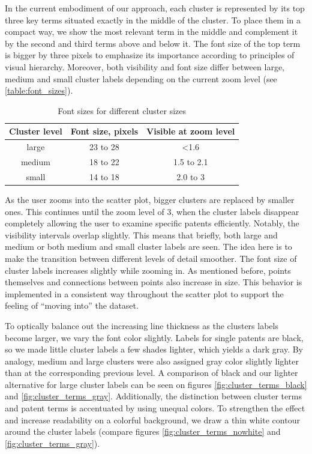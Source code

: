 In the current embodiment of our approach, each cluster is represented by its top three key terms situated exactly in the middle of the cluster.
To place them in a compact way, we show the most relevant term in the middle and complement it by the second and third terms above and below it.
The font size of the top term is bigger by three pixels to emphasize its importance according to principles of visual hierarchy.
Moreover, both visibility and font size differ between large, medium and small cluster labels depending on the current zoom level (see \autoref{table:font_sizes}).

\begin{table}[h!]
\centering
\begin{tabular}{||c c c||} 
 \hline
 Cluster level & Font size, pixels & Visible at zoom level \\ [0.5ex] 
 \hline\hline
 large & 23 to 28 & <1.6 \\ 
 medium & 18 to 22 & 1.5 to 2.1 \\
 small & 14 to 18 & 2.0 to 3 \\ [1ex] 
 \hline
\end{tabular}
\caption{Font sizes for different cluster sizes}
\label{table:font_sizes}
\end{table}

As the user zooms into the scatter plot, bigger clusters are replaced by smaller ones. 
This continues until the zoom level of 3, when the cluster labels disappear completely allowing the user to examine specific patents efficiently.
Notably, the visibility intervals overlap slightly.
This means that briefly, both large and medium or both medium and small cluster labels are seen.
The idea here is to make the transition between different levels of detail smoother.
The font size of cluster labels increases slightly while zooming in.
As mentioned before, points themselves and connections between points also increase in size.
This behavior is implemented in a consistent way throughout the scatter plot to support the feeling of ``moving into'' the dataset.

To optically balance out the increasing line thickness as the clusters labels become larger, we vary the font color slightly.
Labels for single patents are black, so we made little cluster labels a few shades lighter, which yields a dark gray.  
By analogy, medium and large clusters were also assigned gray color slightly lighter than at the corresponding previous level.
A comparison of black and our lighter alternative for large cluster labels can be seen on figures \autoref{fig:cluster_terms_black} and \autoref{fig:cluster_terms_gray}.
Additionally, the distinction between cluster terms and patent terms is accentuated by using unequal colors.
To strengthen the effect and increase readability on a colorful background, we draw a thin white contour around the cluster labels (compare figures \autoref{fig:cluster_terms_nowhite} and \autoref{fig:cluster_terms_gray}).

